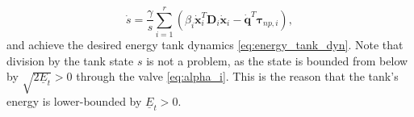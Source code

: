 \documentclass[../main.tex]{subfiles}
\begin{document}
\begin{equation} \label{eq:s_dot}
    \dot{s} = \frac{\gamma}{s} \sum_{i=1}^r \left(\beta_{i} \dot{\bm{x}}_{i}^T\bm{D}_{i}\dot{\bm{x}}_{i} - \dot{\bm{q}}^T\bm{\tau}_{np,i} \right),
\end{equation}
and achieve the desired energy tank dynamics \eqref{eq:energy_tank_dyn}.
Note that division by the tank state $s$ is not a problem, as the state is bounded from below by $\sqrt{2\underline{E}_t}>0$ through the valve \eqref{eq:alpha_i}. This is the reason that the tank's energy is lower-bounded by ${\underline{E}_t > 0}$.
\end{document}
